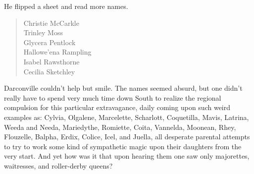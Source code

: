  He flipped a sheet and read more names.
 
\begin{verse}
        \hspace{6em} Christie McCarkle   \\
        \hspace{6em} Trinley Moss        \\
        \hspace{6em} Glycera Pentlock    \\
        \hspace{6em} Hallowe'ena Rampling  \\
        \hspace{6em} Isabel Rawsthorne   \\
        \hspace{6em} Cecilia Sketchley
\end{verse}
 
  Darconville couldn't help but smile. The names seemed absurd, but one didn't
really have to spend very much time down South to realize the regional
compulsion for this particular extravagance, daily coming upon such weird
examples as: Cylvia, Olgalene, Marcelette, Scharlott, Coquetilla, Mavis,
Latrina, Weeda and Needa, Mariedythe, Romiette, Coita, Vannelda, Moonean, Rhey,
Flouzelle, Balpha, Erdix, Colice, Icel, and Juella, all desperate parental
attempts to try to work some kind of sympathetic magic upon their daughters from
the very start. And yet how was it that upon hearing them one saw only
majorettes, 
waitresses, and roller-derby queens?

